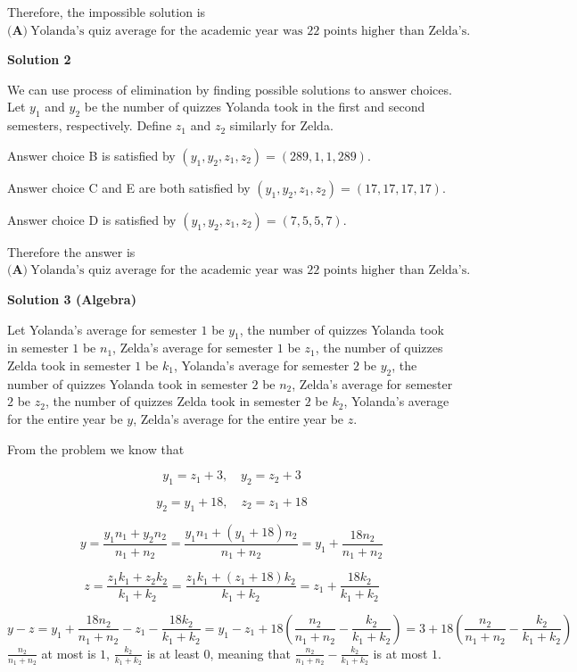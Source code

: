 \begin{enumerate}
 Therefore, the impossible solution is$\boxed{\textbf{(A)}~\text{Yolanda's quiz average for the academic year was 22 points higher than Zelda's.}}$




\textbf{Solution 2}

We can use process of elimination by finding possible solutions to answer choices. Let $y_1$ and $y_2$ be the number of quizzes Yolanda took in the first and second semesters, respectively. Define $z_1$ and $z_2$ similarly for Zelda.

 Answer choice B is satisfied by $(y_1,y_2,z_1,z_2) = (289,1,1,289)$.

 Answer choice C and E are both satisfied by $(y_1,y_2,z_1,z_2) = (17,17,17,17)$.

 Answer choice D is satisfied by $(y_1,y_2,z_1,z_2) = (7,5,5,7)$.

 Therefore the answer is $\boxed{\textbf{(A)}~\text{Yolanda's quiz average for the academic year was 22 points higher than Zelda's.}}$




\textbf{Solution 3 (Algebra)}

Let Yolanda's average for semester $1$ be $y_1$, the number of quizzes Yolanda took in semester $1$ be $n_1$, Zelda's average for semester $1$ be $z_1$, the number of quizzes Zelda took in semester $1$ be $k_1$, Yolanda's average for semester $2$ be $y_2$, the number of quizzes Yolanda took in semester $2$ be $n_2$, Zelda's average for semester $2$ be $z_2$, the number of quizzes Zelda took in semester $2$ be $k_2$, Yolanda's average for the entire year be $y$, Zelda's average for the entire year be $z$.

 From the problem we know that

 
 \[y_1 = z_1 + 3, \quad y_2 = z_2 + 3\]

 \[y_2 = y_1 + 18, \quad z_2 = z_1 + 18\]

 \[y = \frac{ y_1 n_1 + y_2 n_2 }{ n_1 + n_2} = \frac{ y_1 n_1 + (y_1 + 18) n_2 }{ n_1 + n_2} = y_1 + \frac{18 n_2 }{ n_1 + n_2}\]

 \[z = \frac{ z_1 k_1 + z_2 k_2 }{ k_1 + k_2} = \frac{ z_1 k_1 + (z_1 + 18) k_2 }{ k_1 + k_2} = z_1 + \frac{ 18 k_2 }{ k_1 + k_2}\]

 \[y - z = y_1 + \frac{18 n_2 }{ n_1 + n_2} - z_1  - \frac{ 18 k_2 }{ k_1 + k_2} = y_1 - z_1 + 18 \left( \frac{n_2 }{ n_1 + n_2} - \frac{k_2 }{ k_1 + k_2} \right) = 3 + 18 \left( \frac{n_2 }{ n_1 + n_2} - \frac{k_2 }{ k_1 + k_2} \right)\]
$\frac{n_2 }{ n_1 + n_2}$ at most is $1$, $\frac{k_2 }{ k_1 + k_2}$ is at least $0$, meaning that $\frac{n_2 }{ n_1 + n_2} - \frac{k_2 }{ k_1 + k_2}$ is at most $1$.


\end{enumerate}
